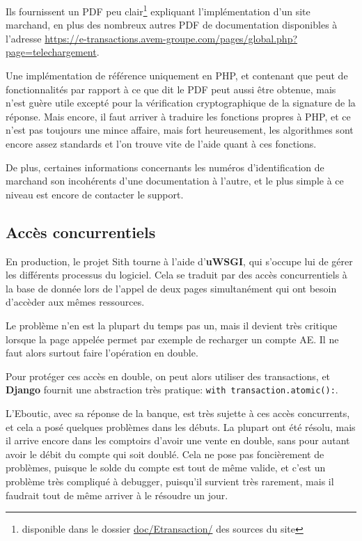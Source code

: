 \documentclass[a4paper]{report}
\begin{document}
\par Ils fournissent un PDF peu clair\footnote{disponible dans le dossier \url{doc/Etransaction/} des sources du site}
expliquant l'implémentation d'un site marchand, en plus des nombreux autres PDF de documentation disponibles à l'adresse
\url{https://e-transactions.avem-groupe.com/pages/global.php?page=telechargement}.

\par Une implémentation de référence uniquement en PHP, et contenant que peut de fonctionnalités par rapport à ce
que dit le PDF peut aussi être obtenue, mais n'est guère utile excepté pour la vérification cryptographique de la
signature de la réponse. Mais encore, il faut arriver à traduire les fonctions propres à PHP, et ce n'est pas toujours
une mince affaire, mais fort heureusement, les algorithmes sont encore assez standards et l'on trouve vite de l'aide
quant à ces fonctions.

\par De plus, certaines informations concernants les numéros d'identification de marchand son incohérents
d'une documentation à l'autre, et le plus simple à ce niveau est encore de contacter le support.

\subsection{Accès concurrentiels}
\label{sub:acces_concurrentiels}
\par En production, le projet Sith tourne à l'aide d'\textbf{uWSGI}, qui s'occupe lui de gérer les différents processus du
logiciel. Cela se traduit par des accès concurrentiels à la base de donnée lors de l'appel de deux pages simultanément
qui ont besoin d'accèder aux mêmes ressources.

\par Le problème n'en est la plupart du temps pas un, mais il devient très critique lorsque la page appelée permet par
exemple de recharger un compte AE. Il ne faut alors surtout faire l'opération en double.

\par Pour protéger ces accès en double, on peut alors utiliser des transactions, et \textbf{Django} fournit une
abstraction très pratique: \verb-with transaction.atomic():-.

\par L'Eboutic, avec sa réponse de la banque, est très sujette à ces accès concurrents, et cela a posé quelques
problèmes dans les débuts. La plupart ont été résolu, mais il arrive encore dans les comptoirs d'avoir une vente en
double, sans pour autant avoir le débit du compte qui soit doublé. Cela ne pose pas foncièrement de problèmes, puisque
le solde du compte est tout de même valide, et c'est un problème très compliqué à debugger, puisqu'il survient très
rarement, mais il faudrait tout de même arriver à le résoudre un jour.
\end{document}
